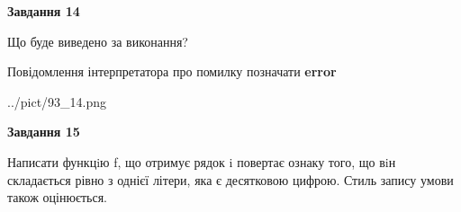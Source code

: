 \documentclass[11pt, ukrainian]{article}
\begin{document}
{\begin {large}
{\begin {center}\textbf{Завдання 14}\end {center}}\par
Що буде виведено за виконання? \par
Повідомлення інтерпретатора про помилку позначати \textbf{error}

\begin{center}
	{../pict/93_14.png}
\end{center}
\newpage

{\begin {center}\textbf{Завдання 15}\end {center}}\par

Написати функцiю f, що отримує рядок i повертає ознаку того, що вiн складається рівно з однієї літери, яка є десятковою цифрою. Стиль запису умови також оцінюється.\par
\newpage

\end {large}}
\end{document}
